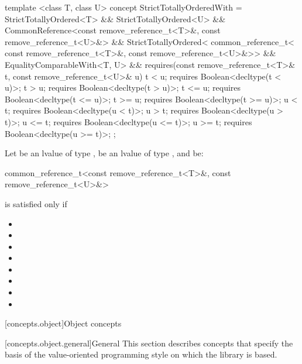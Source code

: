 \begin{itemdecl}
template <class T, class U>
concept StrictTotallyOrderedWith = StrictTotallyOrdered<T> && StrictTotallyOrdered<U> &&
  CommonReference<const remove_reference_t<T>&, const remove_reference_t<U>&> &&
  StrictTotallyOrdered<
    common_reference_t<
      const remove_reference_t<T>&,
      const remove_reference_t<U>&>> &&
  EqualityComparableWith<T, U> &&
  requires(const remove_reference_t<T>& t,
           const remove_reference_t<U>& u) {
    t <  u; requires Boolean<decltype(t <  u)>;
    t >  u; requires Boolean<decltype(t >  u)>;
    t <= u; requires Boolean<decltype(t <= u)>;
    t >= u; requires Boolean<decltype(t >= u)>;
    u <  t; requires Boolean<decltype(u <  t)>;
    u >  t; requires Boolean<decltype(u >  t)>;
    u <= t; requires Boolean<decltype(u <= t)>;
    u >= t; requires Boolean<decltype(u >= t)>;
  };
\end{itemdecl}

\begin{itemdescr}
\pnum
Let  be an lvalue of type ,
 be an lvalue of type ,
and  be:
\begin{codeblock}
common_reference_t<const remove_reference_t<T>&, const remove_reference_t<U>&>
\end{codeblock}
 is satisfied only if

\begin{itemize}
\item {}
\item {}
\item {}
\item {}
\item {}
\item {}
\item {}
\item {}
\end{itemize}
\end{itemdescr}

[concepts.object]{Object concepts}

[concepts.object.general]{General}
\pnum
This section describes concepts that specify the basis of the
value-oriented programming style on which the library is based.

